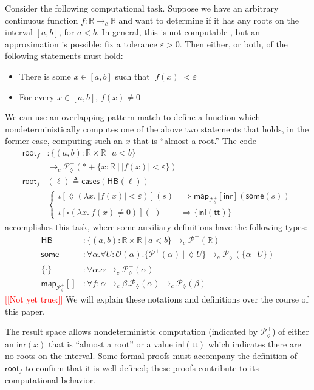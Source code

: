 \documentclass[conference]{IEEEtran}
\newcommand{\PLower}{\mathcal{P}_\lozenge}
\newcommand{\Viet}{\mathcal{P}}
\newcommand{\cto}{\to_c}
\newcommand{\R}{\mathbb{R}}
\newcommand{\map}[2]{\mathsf{map}_{#1}[{#2}]}
\newcommand{\fun}[2]{\lambda {#1}.\  {#2}}
\newcommand{\suchthat}{\ |\ }
\newcommand{\One}{\ast}
\newcommand{\Open}[1]{\mathcal{O}({#1})}
\newcommand{\wildcard}{\_}
\newcommand{\oinclf}[1]{\iota[{#1}]}
\newcommand{\oincl}[2]{\oinclf{#1} \left({#2}\right)}
\newcommand{\Branch}{\Rightarrow}
\newcommand{\note}[1]{\textcolor{red}{[[{#1}]]}}
\begin{document}
Consider the following computational task. Suppose we have an arbitrary continuous function $f : \R \cto \R$ and want to determine if it has any roots on the interval $[a,b]$, for $a < b$. In general, this is not computable \cite{lamcra}, but an approximation is possible: fix a tolerance $\varepsilon > 0$. Then either, or both, of the following statements must hold:
\begin{itemize}
\item There is some $x \in [a, b]$ such that $|f(x)| < \varepsilon$
\item For every $x \in [a, b]$, $f(x) \neq 0$
\end{itemize}
We can use an overlapping pattern match to define a function which nondeterministically computes one of the above two statements that holds, in the former case, computing such an $x$ that is ``almost a root.'' The code
\begin{align*}
\mathsf{root}_f &: \{ (a, b) : \R \times \R \suchthat a < b \}
  \\ &\cto \PLower^+(\One + \{ x : \R \suchthat |f(x)| < \varepsilon \})
\\ \mathsf{root}_f&(\ell) \triangleq \mathsf{cases}(\mathsf{HB}(\ell))
\\ &\begin{cases}
\oincl{\lozenge (\fun{x}{|f(x)| < \varepsilon})}{s} 
  &\Branch \map{\PLower^+}{\mathsf{inr}}(\mathsf{some}(s))
\\ \oincl{\square (\fun{x}{f(x) \neq 0})}{\wildcard}
  &\Branch \{ \mathsf{inl}(\mathsf{tt}) \}
\end{cases}
\end{align*}
accomplishes this task, where some auxiliary definitions have the following types:
\begin{align*}
\mathsf{HB} &: \{ (a, b) : \R \times \R \suchthat a < b \} \cto \Viet^+(\R)
\\ \mathsf{some} &: \forall \alpha. \forall U : \Open{\alpha}. \{ \Viet^+(\alpha) \suchthat \lozenge U \} \cto \PLower^+(\{ \alpha \suchthat U \})
\\ \{ \cdot \} &: \forall \alpha. \alpha \cto \PLower^+(\alpha)
\\ \map{\PLower^+}{} &: \forall f : \alpha \cto \beta. \PLower(\alpha) \cto \PLower(\beta)
\end{align*}
\note{Not yet true:} We will explain these notations and definitions over the course of this paper.

The result space allows nondeterministic computation (indicated by $\PLower^+$) of either an $\mathsf{inr}(x)$ that is ``almost a root'' or a value $\mathsf{inl}(\mathsf{tt})$ which indicates there are no roots on the interval. Some formal proofs must accompany the definition of $\mathsf{root}_f$ to confirm that it is well-defined; these proofs contribute to its computational behavior.
 
\end{document}

